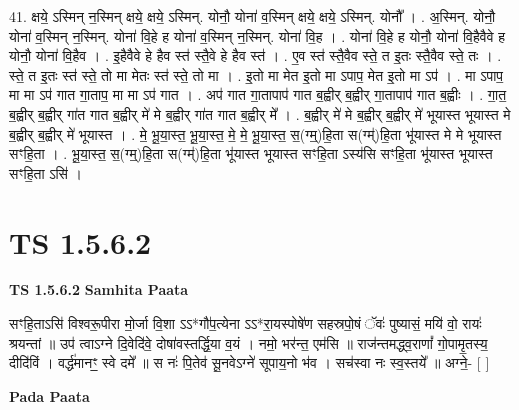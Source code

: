 \documentclass[17pt]{extarticle}
\begin{document}
41. क्षये॒ ऽस्मिन् न॒स्मिन् क्षये॒ क्षये॒ ऽस्मिन्. योनौ॒ योना॑ व॒स्मिन् क्षये॒ क्षये॒ ऽस्मिन्. योनौ᳚ । . अ॒स्मिन्. योनौ॒ योना॑ व॒स्मिन् न॒स्मिन्. योना॑ वि॒हे ह योना॑ व॒स्मिन् न॒स्मिन्. योना॑ वि॒ह । . योना॑ वि॒हे ह योनौ॒ योना॑ वि॒हैवैवे ह योनौ॒ योना॑ वि॒हैव । . इ॒हैवैवे हे हैव स्त॑ स्तै॒वे हे हैव स्त॑ । . ए॒व स्त॑ स्तै॒वैव स्ते॒ त इ॒तः स्तै॒वैव स्ते॒ तः । . स्ते॒ त इ॒तः स्त॑ स्ते॒ तो मा मेतः स्त॑ स्ते॒ तो मा । . इ॒तो मा मेत इ॒तो मा ऽपाप॒ मेत इ॒तो मा ऽप॑ । . मा ऽपाप॒ मा मा ऽप॑ गात गा॒ताप॒ मा मा ऽप॑ गात । . अप॑ गात गा॒तापाप॑ गात ब॒ह्वीर् ब॒ह्वीर् गा॒तापाप॑ गात ब॒ह्वीः । . गा॒त॒ ब॒ह्वीर् ब॒ह्वीर् गा॑त गात ब॒ह्वीर् मे॑ मे ब॒ह्वीर् गा॑त गात ब॒ह्वीर् मे᳚ । . ब॒ह्वीर् मे॑ मे ब॒ह्वीर् ब॒ह्वीर् मे॑ भूयास्त भूयास्त मे ब॒ह्वीर् ब॒ह्वीर् मे॑ भूयास्त । . मे॒ भू॒या॒स्त॒ भू॒या॒स्त॒ मे॒ मे॒ भू॒या॒स्त॒ स॒(ग्म्॒)हि॒ता स(ग्म्॑)हि॒ता भू॑यास्त मे मे भूयास्त सꣳहि॒ता । . भू॒या॒स्त॒ स॒(ग्म्॒)हि॒ता स(ग्म्॑)हि॒ता भू॑यास्त भूयास्त सꣳहि॒ता ऽस्य॑सि सꣳहि॒ता भू॑यास्त भूयास्त सꣳहि॒ता ऽसि॑ । \newline
\pagebreak
{}

\section{ TS 1.5.6.2 }

\textbf{TS 1.5.6.2 } \newline
\textbf{Samhita Paata} \newline

सꣳहि॒ताऽसि॑ विश्वरू॒पीरा मो॒र्जा वि॒शा ऽऽ*गौ॑प॒त्येना ऽऽ*रा॒यस्पोषे॑ण सहस्रपो॒षं ॅवः॑ पुष्यासं॒ मयि॑ वो॒ रायः॑ श्रयन्तां ॥ उप॑ त्वाऽग्ने दि॒वेदि॑वे॒ दोषा॑वस्तर्द्धि॒या व॒यं । नमो॒ भर॑न्त॒ एम॑सि ॥ राज॑न्तमद्ध्व॒राणां᳚ गो॒पामृ॒तस्य॒ दीदि॑विं । वर्द्ध॑मानꣳ॒॒ स्वे दमे᳚ ॥ स नः॑ पि॒तेव॑ सू॒नवेऽग्ने॑ सूपाय॒नो भ॑व । सच॑स्वा नः स्व॒स्तये᳚ ॥ अग्ने॒- [ ] \newline

\textbf{Pada Paata} \newline
\end{document}
